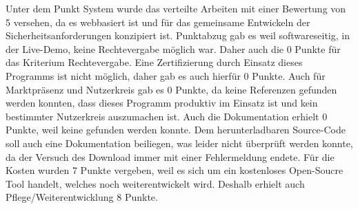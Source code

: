 Unter dem Punkt System wurde das verteilte Arbeiten mit einer Bewertung von  5 versehen, da es webbasiert ist und für das gemeinsame Entwickeln der Sicherheitsanforderungen konzipiert ist. Punktabzug gab es weil softwareseitig, in der Live-Demo, keine Rechtevergabe möglich war. Daher auch die 0 Punkte für das Kriterium Rechtevergabe. Eine Zertifizierung durch Einsatz dieses Programms ist nicht möglich, daher gab es auch hierfür 0 Punkte. Auch für Marktpräsenz und Nutzerkreis gab es 0 Punkte, da keine Referenzen gefunden werden konnten, dass dieses Programm produktiv im Einsatz ist und kein bestimmter Nutzerkreis auszumachen ist. Auch die Dokumentation erhielt 0 Punkte, weil keine gefunden werden konnte. Dem herunterladbaren Source-Code soll auch eine Dokumentation beiliegen, was leider nicht überprüft werden konnte, da der Versuch des Download immer mit einer Fehlermeldung endete. Für die Kosten wurden 7 Punkte vergeben, weil es sich um ein kostenloses Open-Soucre Tool handelt, welches noch weiterentwickelt wird. Deshalb erhielt auch Pflege/Weiterentwicklung 8 Punkte.\\
